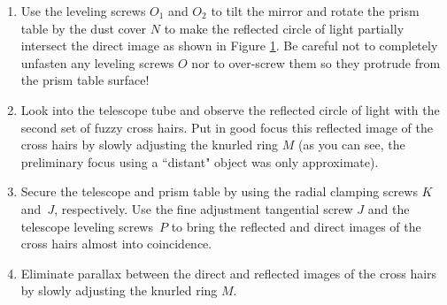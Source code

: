 \documentclass[12pt]{article}
\begin{document}
\begin{enumerate}
\begin{figure}[ht!]
    \centering
    \caption{The direct and reflected images of cross hairs in the autocollimation method. }
    \label{Reflected circle of light}
\end{figure} 

    \item Use the leveling screws $O_1$ and $O_2$ to tilt the mirror and rotate the prism table by the dust cover $N$ to make the reflected circle of light partially intersect the direct image as shown in Figure \ref{Reflected circle of light}. Be careful not to completely unfasten any leveling screws $O$ nor to over-screw them so they protrude from the prism table surface! 
    \item Look into the telescope tube and observe the reflected circle of light with the second set of fuzzy cross hairs. Put in good focus this reflected image of the cross hairs by slowly adjusting the knurled ring $M$ (as you can see, the preliminary focus using a ``distant" object was only approximate). 
    \item Secure the telescope and prism table by using the radial clamping screws $K$ and~$J$, respectively. Use the fine adjustment tangential screw $J$ and the telescope leveling screws~$P$ to bring the reflected and direct images of the cross hairs almost into coincidence.
    \item Eliminate parallax between the direct and reflected images of the cross hairs by slowly adjusting the knurled ring $M$.
\end{enumerate}
\end{document}
